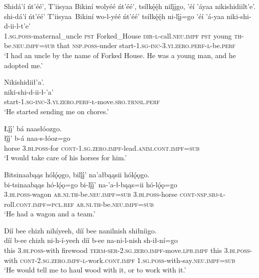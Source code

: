 \ea\label{ex:text1-8-2}
Shidá’í ńt’éé’, T’iisyaa Bikiní wolyéé ńt’éé’, tsíłkę́ę́h nilį́įgo, ’éí ’áyaa nikishidiilt’e’.\\
\gll shi-dá’í	ńt’éé’	T’iisyaa~{Bikiní}	wo-l-yéé	ńt’éé’	tsíłkę́ę́h	ni-lį́į=go	’éí	’á-yaa	niki-shi-d-ii-l-t’e’\\
     1.\textsc{sg}.\textsc{poss}-maternal\_uncle	\textsc{pst}	Forked\_House	\textsc{dir}-\textsc{l}-call.\textsc{neu}.\textsc{impf}	\textsc{pst}	young	\textsc{th}-be.\textsc{neu}.\textsc{impf}=\textsc{sub}	that	\textsc{nsp}.\textsc{poss}-under	start-1.\textsc{sg}-\textsc{inc}-3.\textsc{yi}.\textsc{zero}.\textsc{perf}-\textsc{l}-be.\textsc{perf}\\
\glt `I had an uncle by the name of Forked House. He was a young man, and he adopted me.'
\z

\ea\label{ex:text1-8-3}
Nikishidiił’a’.\\
\gll niki-shi-d-ii-ł-’a’\\
     start-1.\textsc{sg}-\textsc{inc}-3.\textsc{yi}.\textsc{zero}.\textsc{perf}-\textsc{ł}-move.\textsc{sro}.\textsc{trnsl}.\textsc{perf}\\
\glt `He started sending me on chores.'
\z

\ea\label{ex:text1-8-4}
Łį́į́’ bá naasłóozgo.\\
\gll łį́į́’	b-á	naa-s-łóoz=go\\
     horse	3.\textsc{bi}.\textsc{poss}-for	\textsc{cont}-1.\textsc{sg}.\textsc{zero}.\textsc{impf}-lead.\textsc{anim}.\textsc{cont}.\textsc{impf}=\textsc{sub}\\
\glt `I would take care of his horses for him.'
\z

\ea\label{ex:text1-8-5}
Bitsinaabąąs hólǫ́ǫgo, bilį́į́’ na’ałbąąsii hólǫ́ǫgo.\\
\gll bi-tsinaabąąs	hó-lǫ́ǫ=go	bi-lį́į́’	na-’a-ł-bąąs=ii	hó-lǫ́ǫ=go\\
     3.\textsc{bi}.\textsc{poss}-wagon	\textsc{ar}.\textsc{ni}.\textsc{th}-be.\textsc{neu}.\textsc{impf}=\textsc{sub}	3.\textsc{bi}.\textsc{poss}-horse	\textsc{cont}-\textsc{nsp}.\textsc{sbj}-\textsc{ł}-roll.\textsc{cont}.\textsc{impf}=\textsc{pcl}.\textsc{ref}	\textsc{ar}.\textsc{ni}.\textsc{th}-be.\textsc{neu}.\textsc{impf}=\textsc{sub}\\
\glt `He had a wagon and a team.'
\z

\ea\label{ex:text1-8-6}
Díí bee chizh nihíyeeh, díí bee nanilnish shiłníigo.\\
\gll díí	b-ee	chizh	ni-h-í-yeeh	díí	b-ee	na-ni-l-nish	sh-ił-ní=go\\
     this	3.\textsc{bi}.\textsc{poss}-with	firewood	\textsc{term}-\textsc{ser}-2.\textsc{sg}.\textsc{zero}.\textsc{impf}-move.\textsc{lpb}.\textsc{impf}	this	3.\textsc{bi}.\textsc{poss}-with	\textsc{cont}-2.\textsc{sg}.\textsc{zero}.\textsc{impf}-\textsc{l}-work.\textsc{cont}.\textsc{impf}	1.\textsc{sg}.\textsc{poss}-with-say.\textsc{neu}.\textsc{impf}=\textsc{sub}\\
\glt `He would tell me to haul wood with it, or to work with it.'
\z


